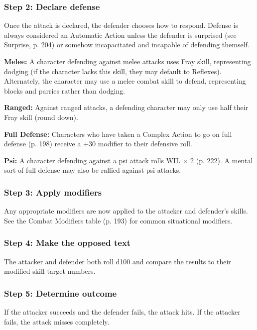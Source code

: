 \subsubsection{Step 2: Declare defense} 

Once the attack is declared, the defender chooses how to respond. Defense is always considered an Automatic Action unless the defender is surprised (see Surprise, p. 204) or somehow incapacitated and incapable of defending themself. 

\textbf{Melee:} A character defending against melee attacks uses Fray skill, representing dodging (if the character lacks this skill, they may default to Reflexes). Alternately, the character may use a melee combat skill to defend, representing blocks and parries rather than dodging. 

\textbf{Ranged:} Against ranged attacks, a defending character may only use half their Fray skill (round down). 

\textbf{Full Defense:} Characters who have taken a Complex Action to go on full defense (p. 198) receive a +30 modifier to their defensive roll. 

\textbf{Psi:} A character defending against a psi attack rolls WIL $\times$ 2 (p. 222). A mental sort of full defense may also be rallied against psi attacks. 

\subsubsection{Step 3: Apply modifiers} 

Any appropriate modifiers are now applied to the attacker and defender’s skills. See the Combat Modifiers table (p. 193) for common situational modifiers. 

\subsubsection{Step 4: Make the opposed text} 

The attacker and defender both roll d100 and compare the results to their modified skill target numbers. 

\subsubsection{Step 5: Determine outcome} 

If the attacker succeeds and the defender fails, the attack hits. If the attacker fails, the attack misses completely. 


